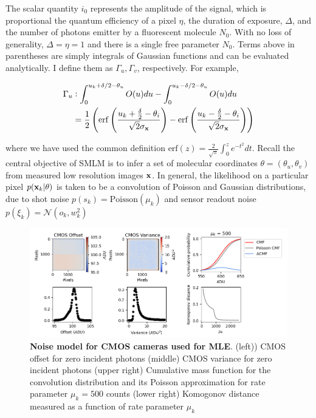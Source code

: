 The scalar quantity $i_{0}$ represents the amplitude of the signal, which is proportional the quantum efficiency of a pixel $\eta$, the duration of exposure, $\Delta$, and the number of photons emitter by a fluorescent molecule $N_{0}$. With no loss of generality, $\Delta = \eta = 1$ and there is a single free parameter $N_{0}$. Terms above in parentheses are simply integrals of Gaussian functions and can be evaluated analytically. I define them as $\Gamma_{u},\Gamma_{v}$, respectively. For example,

\begin{align*}
\Gamma_{u} &\vcentcolon  \int_{0}^{u_{k}+\delta /2 - \theta_{u}} O(u)du - \int_{0}^{u_{k}-\delta /2 - \theta_{u}} O(u)du\\
&= \frac{1}{2}\left(\mathrm{erf}\left(\frac{u_{k}+\frac{\delta}{2}-\theta_{i}}{\sqrt{2}\sigma_{\bold{x}}}\right) -\mathrm{erf}\left(\frac{u_{k}-\frac{\delta}{2}-\theta_{i}}{\sqrt{2}\sigma_{\bold{x}}}\right)\right)
\end{align*}

where we have used the common definition $\mathrm{erf}(z) = \frac{2}{\sqrt{\pi}}\int_{0}^{z}e^{-t^{2}}dt$. Recall the central objective of SMLM is to infer a set of molecular coordinates $\theta=(\theta_{u},\theta_{v})$ from measured low resolution images $\bold{x}$. In general, the likelihood on a particular pixel $p(\bold{x}_k\lvert\theta)$ is taken to be a convolution of Poisson and Gaussian distributions, due to shot noise $p(s_{k}) = \mathrm{Poisson}(\mu_{k})$ and sensor readout noise $p(\xi_{k}) = \mathcal{N}(o_{k},w_{k}^{2})$ 

\begin{figure}[t]
\begin{center}
\includegraphics[width=16cm]{media/Noise.png}
\end{center}
\caption{\textbf{Noise model for CMOS cameras used for MLE}. (left)) CMOS offset for zero incident photons (middle) CMOS variance for zero incident photons (upper right) Cumulative mass function for the convolution distribution and its Poisson approximation for rate parameter $\mu_{k} = 500$ counts (lower right) Komogonov distance measured as a function of rate parameter $\mu_{k}$}
\end{figure}


